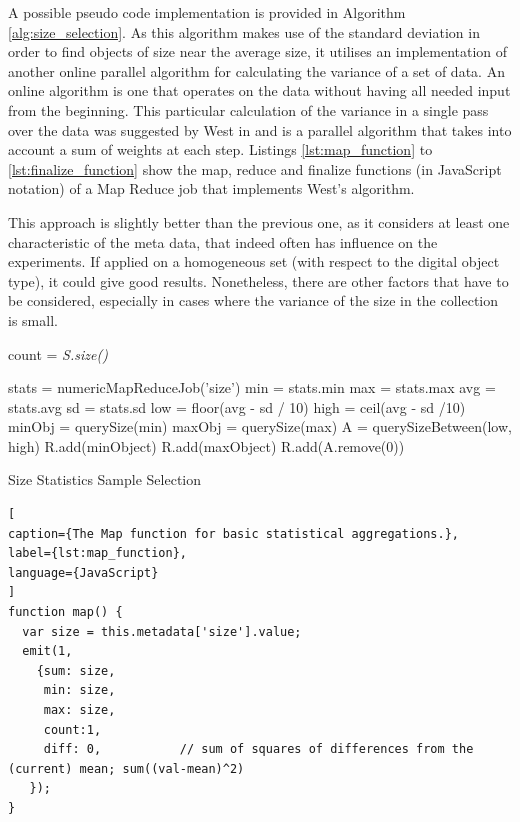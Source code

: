 A possible pseudo code implementation is provided in Algorithm \ref{alg:size_selection}. As this algorithm makes use of the standard deviation in order to find objects of size near the average size, it utilises an implementation of another online parallel algorithm for calculating the variance of a set of data. An online algorithm is one that operates on the data without having all needed input from the beginning. This particular calculation of the variance in a single pass over the data was suggested by West in \cite{West:1979:UMV:359146.359153} and is a parallel algorithm that takes into account a sum of weights at each step. Listings \ref{lst:map_function} to \ref{lst:finalize_function} show the map, reduce and finalize functions (in JavaScript notation) of a Map Reduce job that implements West's algorithm.

This approach is slightly better than the previous one, as it considers at least one characteristic of the meta data, that indeed often has influence on the experiments. If applied on a homogeneous set (with respect to the digital object type), it could give good results. Nonetheless, there are other factors that have to be considered, especially in cases where the variance of the size in the collection is small.

\begin{algorithm}[bh]
\SetAlgoLined
{}

 \BlankLine

count = \textit{S.size()}\; 

stats = numericMapReduceJob('size')\;
min = stats.min\;
max = stats.max\;
avg = stats.avg\;
sd = stats.sd\;
low = floor(avg - sd / 10)\;
high = ceil(avg - sd /10)\;
\BlankLine
minObj  = querySize(min)\;
maxObj = querySize(max)\;
A = querySizeBetween(low, high)\;
\BlankLine
R.add(minObject)\;
R.add(maxObject)\;
\BlankLine
   {
    R.add(A.remove(0))\;
  }
 \caption{Size Statistics Sample Selection}
 \label{alg:size_selection}
\end{algorithm}


\vspace{1em}
\begin{lstlisting}[
caption={The Map function for basic statistical aggregations.},
label={lst:map_function},
language={JavaScript}
]
function map() {
  var size = this.metadata['size'].value;
  emit(1,
  	{sum: size, 
	 min: size,
	 max: size,
	 count:1,
	 diff: 0,			// sum of squares of differences from the (current) mean; sum((val-mean)^2)
   });
}
\end{lstlisting}


